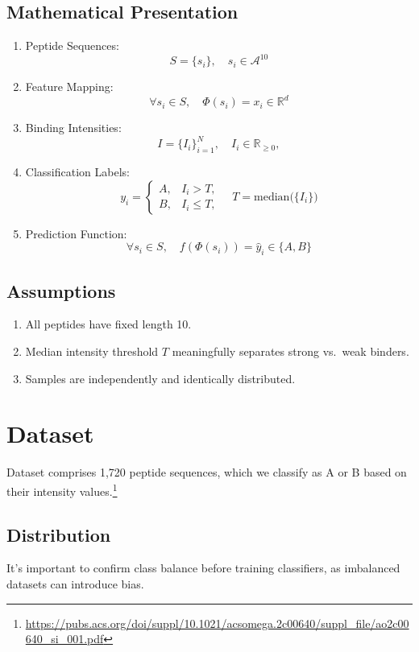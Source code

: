 \documentclass{article}
\begin{document}
\subsection{Mathematical Presentation}
\begin{enumerate}
    \item Peptide Sequences:    \[S = \{s_i\},\quad s_i \in \mathcal{A}^{10}\]

    \item Feature Mapping:    \[\forall s_i \in S, \quad \Phi(s_i) = x_i \in \mathbb{R}^d\]
    
    \item Binding Intensities:    \[I = \{I_i\}_{i=1}^N,\quad I_i \in \mathbb{R}_{\ge0},\]

    \item Classification Labels:   \[y_i = 
    \begin{cases}
      A, & I_i > T,\\
      B, & I_i \le T,
    \end{cases}
    \quad T = \mathrm{median}\bigl(\{I_i\}\bigr)\]

    \item Prediction Function: \[
    \forall s_i \in S, \quad
    f(\Phi(s_i)) = \hat y_i \in \{A,B\}
    \]
\end{enumerate}

\subsection{Assumptions}
\begin{enumerate}
  \item All peptides have fixed length 10.
  \item Median intensity threshold $T$ meaningfully separates strong vs.\ weak binders.
  \item Samples are independently and identically distributed.
\end{enumerate}

\section{Dataset}
Dataset comprises 1,720 peptide sequences, which we classify as A or B based on their intensity values.\footnote{\url{https://pubs.acs.org/doi/suppl/10.1021/acsomega.2c00640/suppl_file/ao2c00640_si_001.pdf}}

\subsection{Distribution}
It’s important to confirm class balance before training classifiers, as imbalanced datasets can introduce bias. 
\end{document}
